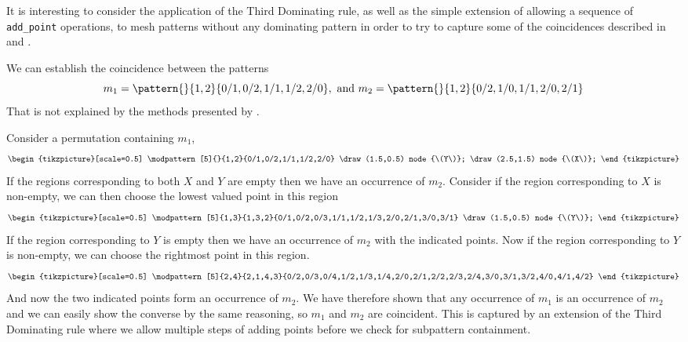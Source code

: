It is interesting to consider the application of the Third Dominating rule,
as well as the simple extension of allowing a sequence of \texttt{add\_point}
operations, to mesh patterns without any dominating pattern in order to try to
capture some of the coincidences described in
\textcite{DBLP:journals/combinatorics/HilmarssonJSVU15}
 and \textcite{DBLP:journals/corr/ClaessonTU14}.
 \begin{example}
   We can establish the coincidence between the patterns
   \begin{equation*}
     m_1 = \pattern{}{1,2}{0/1,0/2,1/1,1/2,2/0}, \text{ and } m_2 = \pattern{}{1,2}{0/2,1/0,1/1,2/0,2/1}
   \end{equation*}
   That is not explained by the methods presented by \textcite{DBLP:journals/corr/ClaessonTU14}.

   Consider a permutation containing \(m_1\),
   \begin{equation*}
     \begin{tikzpicture}[scale=0.5]
         \modpattern[5]{}{1,2}{0/1,0/2,1/1,1/2,2/0}
         \draw (1.5,0.5) node {\(Y\)};
         \draw (2.5,1.5) node {\(X\)};
     \end{tikzpicture}
   \end{equation*}
   If the regions corresponding to both \(X\) and \(Y\) are empty then we have
   an occurrence of \(m_2\).
   Consider if the region corresponding to \(X\) is non-empty, we can then choose
   the lowest valued point in this region
   \begin{equation*}
     \begin{tikzpicture}[scale=0.5]
         \modpattern[5]{1,3}{1,3,2}{0/1,0/2,0/3,1/1,1/2,1/3,2/0,2/1,3/0,3/1}
         \draw (1.5,0.5) node {\(Y\)};
     \end{tikzpicture}
   \end{equation*}
   If the region corresponding to \(Y\) is empty then we have an occurrence of
   \(m_2\) with the indicated points.
   Now if the region corresponding to \(Y\) is non-empty, we can choose the
   rightmost point in this region.
   \begin{equation*}
     \begin{tikzpicture}[scale=0.5]
         \modpattern[5]{2,4}{2,1,4,3}{0/2,0/3,0/4,1/2,1/3,1/4,2/0,2/1,2/2,2/3,2/4,3/0,3/1,3/2,4/0,4/1,4/2}
     \end{tikzpicture}
   \end{equation*}
   And now the two indicated points form an occurrence of \(m_2\).
   We have therefore shown that any occurrence of \(m_1\) is an occurrence of
   \(m_2\) and we can easily show the converse by the same reasoning, so \(m_1\)
   and \(m_2\) are coincident.
   This is captured by an extension of the Third Dominating rule where we allow
   multiple steps of adding points before we check for subpattern containment.
 \end{example}
